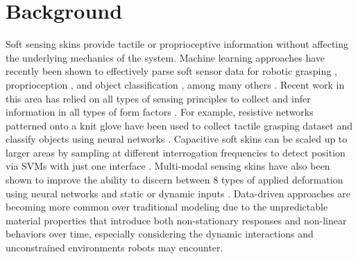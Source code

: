 \documentclass{article}
\begin{document}

\vspace{-0.1in}
\section{Background} 
\vspace{-0.1in}
Soft sensing skins provide tactile or proprioceptive information without affecting the underlying mechanics of the system. Machine learning approaches have recently been shown to effectively parse soft sensor data for robotic grasping \cite{choi2018learning, calandra2017feeling, calandra2018more}, proprioception \cite{van2018soft}, and object classification \cite{chin2019automated}, among many others \cite{shih2020electronic, chin2020machine, yan2021soft}. Recent work in this area has relied on all types of sensing principles to collect and infer information in all types of form factors \cite{yuan2017gelsight, harber2020tunable, buscher2015flexible}. For example, resistive networks patterned onto a knit glove have been used to collect tactile grasping dataset and classify objects using neural networks \cite{sundaram2019learning}. Capacitive soft skins can be scaled up to larger areas by sampling at different interrogation frequencies to detect position via SVMs with just one interface \cite{sonar2018any}. Multi-modal sensing skins have also been shown to improve the ability to discern between 8 types of applied deformation using neural networks \cite{kim2020heterogeneous} and static or dynamic inputs \cite{navaraj2019fingerprint}. Data-driven approaches are becoming more common over traditional modeling due to the unpredictable material properties that introduce both non-stationary responses and non-linear behaviors over time, especially considering the dynamic interactions and unconstrained environments robots may encounter. 
\end{document}
